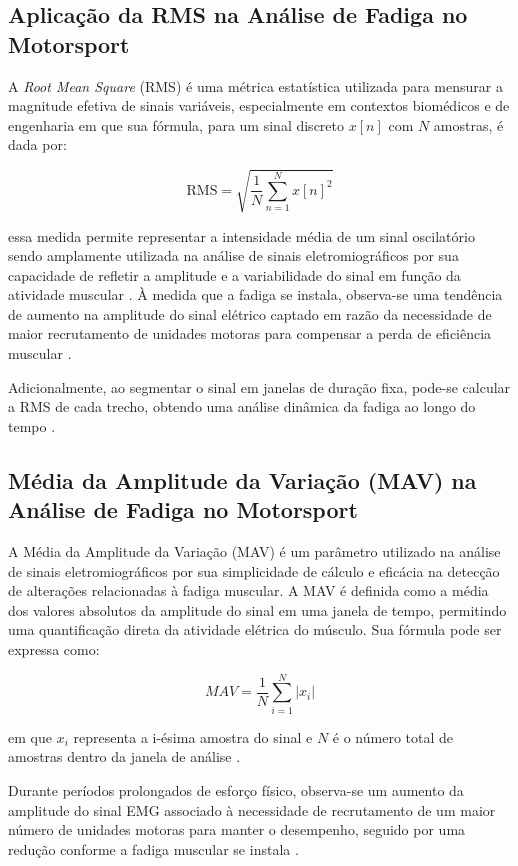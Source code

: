 \documentclass[symbols]{fei}
\begin{document}
\subsection{Aplicação da RMS na Análise de Fadiga no Motorsport}

A \textit{Root Mean Square} (RMS) é uma métrica estatística utilizada para mensurar a magnitude efetiva de sinais variáveis, 
especialmente em contextos biomédicos e de engenharia em que sua fórmula, para um sinal discreto $x[n]$ com $N$ amostras, é dada por:  

\begin{equation}
\text{RMS} = \sqrt{\frac{1}{N} \sum_{n=1}^{N} x[n]^2}
\end{equation}

essa medida permite representar a intensidade média de um sinal oscilatório sendo amplamente utilizada na análise de sinais eletromiográficos por sua capacidade de 
refletir a amplitude e a variabilidade do sinal em função da atividade muscular \cite{deluca1997use}. 
À medida que a fadiga se instala, observa-se uma tendência de aumento na amplitude do sinal elétrico captado em razão da necessidade de maior 
recrutamento de unidades motoras para compensar a perda de eficiência muscular \cite{gandevia2001}.

Adicionalmente, ao segmentar o sinal em janelas de duração fixa, pode-se calcular a RMS de cada trecho, obtendo uma análise dinâmica da 
fadiga ao longo do tempo \cite{merletti2004electromyography}.

\subsection{Média da Amplitude da Variação (MAV) na Análise de Fadiga no Motorsport}

A Média da Amplitude da Variação (MAV) é um parâmetro utilizado na análise de sinais eletromiográficos por sua simplicidade 
de cálculo e eficácia na detecção de alterações relacionadas à fadiga muscular. A MAV é definida como a média dos valores absolutos da 
amplitude do sinal em uma janela de tempo, permitindo uma quantificação direta da atividade elétrica do músculo. Sua fórmula pode ser 
expressa como:

\[
MAV = \frac{1}{N} \sum_{i=1}^{N} |x_i|
\]

em que \(x_i\) representa a i-ésima amostra do sinal e \(N\) é o número total de amostras dentro da janela de análise \cite{phinyomark2012feature}.

Durante períodos prolongados de esforço físico, observa-se um aumento da amplitude do sinal EMG associado à necessidade de recrutamento 
de um maior número de unidades motoras para manter o desempenho, seguido por uma redução conforme a fadiga muscular 
se instala \cite{deluca1997use}.
\end{document}
